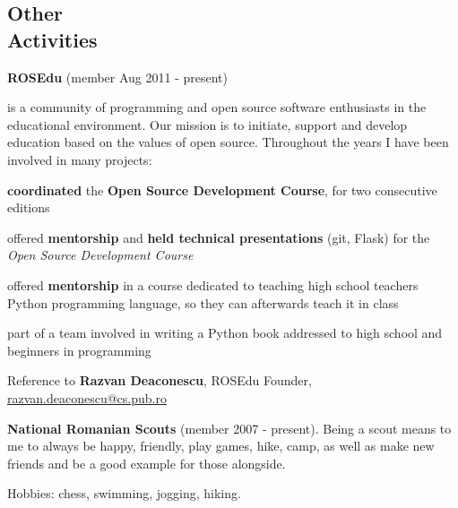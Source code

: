 \documentclass[margin,line]{resume}
\begin{document}
\begin{resume}

    \section{\mysidestyle Other\\Activities}

    \textbf{ROSEdu} (member Aug 2011 - present)
    {\fontsize{2.65mm}{1em}\selectfont
      is a community of
      programming and open source software enthusiasts in the educational environment. Our mission is to
      initiate, support and develop education based on the values of open source.\vspace{1mm}
      Throughout the years I have been involved in many projects:
      \begin{list2}
          \item \textbf{coordinated} the \textbf{Open Source Development Course}, for two consecutive editions
          \item offered \textbf{mentorship} and \textbf{held technical presentations} (git, Flask) for the \textit{Open Source Development Course}
          \item offered \textbf{mentorship} in a course dedicated to teaching high school teachers Python programming language, so they can afterwards teach it in class
          \item part of a team involved in writing a Python book addressed to high school and beginners in programming
      \end{list2}\vspace{-3.5mm}
      Reference to \textbf{Razvan Deaconescu}, ROSEdu Founder, \href{mailto:razvan.deaconescu@cs.pub.ro}{razvan.deaconescu@cs.pub.ro}
    }\vspace{-1mm}

	\textbf{National Romanian Scouts} (member 2007 - present).
    {\fontsize{2.65mm}{1em}\selectfont
      Being a scout means to me to always be happy, friendly, play games, hike, camp, as well as make new friends and be a good example for those alongside.
    }\vspace{-1mm}

	Hobbies: chess, swimming, jogging, hiking.



\end{resume}
\end{document}
